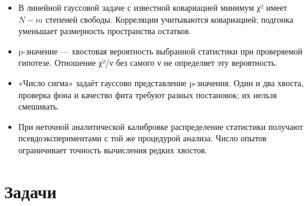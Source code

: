 \documentclass[
  russian,
  11pt,
  a4paper,
  open=any]{scrbook}
\providecommand{\tightlist}{%
  \setlength{\itemsep}{0pt}\setlength{\parskip}{0pt}}
\begin{document}
\begin{bookchaptersummary}

\begin{itemize}
\tightlist
\item
  В линейной гауссовой задаче с известной ковариацией минимум χ² имеет
  \(N-m\) степеней свободы. Корреляции учитываются ковариацией; подгонка
  уменьшает размерность пространства остатков.
\item
  p-значение --- хвостовая вероятность выбранной статистики при
  проверяемой гипотезе. Отношение χ²/ν без самого ν не определяет эту
  вероятность.
\item
  «Число сигма» задаёт гауссово представление p-значения. Один и два
  хвоста, проверка фона и качество фита требуют разных постановок; их
  нельзя смешивать.
\item
  При неточной аналитической калибровке распределение статистики
  получают псевдоэкспериментами с той же процедурой анализа. Число
  опытов ограничивает точность вычисления редких хвостов.
\end{itemize}

\end{bookchaptersummary}

\section{Задачи}\label{ux437ux430ux434ux430ux447ux438-12}
\end{document}
